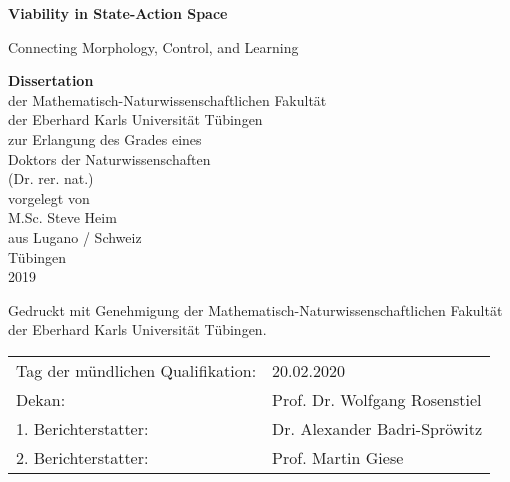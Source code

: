 \begin{titlepage}
   \begin{center}
    \vspace*{1cm}
    {\LARGE \textbf{Viability in State-Action Space\\}}

    \vspace{0.5cm}
    {\Large Connecting Morphology, Control, and Learning}

    \vspace{1.5cm}

    \textbf{Dissertation} \\
    {\large
    der Mathematisch-Naturwissenschaftlichen Fakultät \\
    der Eberhard Karls Universität Tübingen \\
    zur Erlangung des Grades eines \\
    Doktors der Naturwissenschaften \\
    (Dr. rer. nat.) \\
    \vspace{4cm}
    vorgelegt von \\
    M.Sc. Steve Heim \\
    aus Lugano / Schweiz \\
    \vspace{0.5cm}
    T\"{u}bingen \\
    2019}
    \end{center}
    \cleardoublepage
    \mbox{}
    \vfill
    \noindent
    Gedruckt mit Genehmigung der Mathematisch-Naturwissenschaftlichen Fakultät der Eberhard Karls Universität Tübingen. \\
    \vspace{2.5cm}
    \begin{table}[h!]
    \begin{tabular}{l l}
    Tag der mündlichen Qualifikation: & 20.02.2020 \\
    Dekan: & Prof. Dr. Wolfgang Rosenstiel \\
    1. Berichterstatter: & Dr. Alexander Badri-Spr\"{o}witz \\
    2. Berichterstatter: & Prof. Martin Giese \\
    \end{tabular}
    \end{table}






 
\end{titlepage}